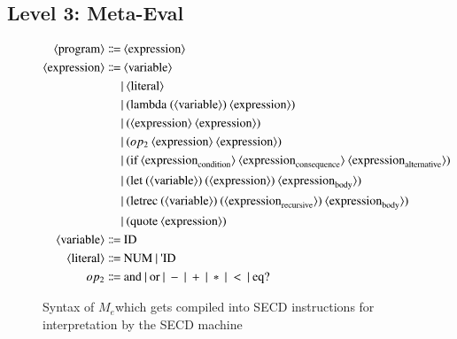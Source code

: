 \documentclass[a4paper,12pt,twoside,openright]{report}
\theoremstyle{definition}
\newcommand{\ts}{\textquotesingle}
\newcommand{\mevl}{$M_{e}$}
\begin{document}
\subsection{Level 3: Meta-Eval}
\begin{figure}[ht!]
\begin{align*}
	\langle \text{program} \rangle \Coloneqq & \: \langle \text{expression} \rangle \\
	\langle \text{expression} \rangle \Coloneqq & \: \langle \text{variable} \rangle \\
															   & | \: \langle \text{literal} \rangle \\
															   & | \: \text{(lambda (} \langle \text{variable} \rangle\text{)} \: \langle \text{expression} \rangle\text{)} \\
															   & | \: \text{(} \langle \text{expression} \rangle \: \langle \text{expression} \rangle \text{)} \\
															   & | \: \text{(} op_{2} \: \langle \text{expression} \rangle \: \langle \text{expression} \rangle \text{)} \\
															   & | \: \text{(if} \: \langle \text{expression}_\text{condition} \rangle \: \langle \text{expression}_\text{consequence} \rangle \: \langle \text{expression}_\text{alternative} \rangle \text{)} \\
															   & | \: \text{(let} \: \text{(} \langle \text{variable} \rangle \text{)} \: \text{(}\langle \text{expression} \rangle \text{)} \: \langle \text{expression}_\text{body} \rangle \text{)} \\
															   & | \: \text{(letrec} \: \text{(} \langle \text{variable} \rangle \text{)} \: \text{(}\langle \text{expression}_\text{recursive} \rangle \text{)} \: \langle \text{expression}_\text{body} \rangle \text{)} \\
															   & | \: \text{(quote} \: \langle \text{expression} \rangle \text{)} \\
	\langle \text{variable} \rangle \Coloneqq & \: \text{ID} \\
	\langle \text{literal} \rangle \Coloneqq & \: \text{NUM} \: | \: \text{{\ts}ID} \\
	op_{2} \Coloneqq & \: \text{and} \: | \: \text{or} \: | \: - \: | \: + \: | \: * \: | \: < \: | \: \text{eq?}
\end{align*}
\caption{Syntax of \mevl which gets compiled into SECD instructions for interpretation by the SECD machine}
\label{fig:mevl_syntax}
\end{figure}
\end{document}
